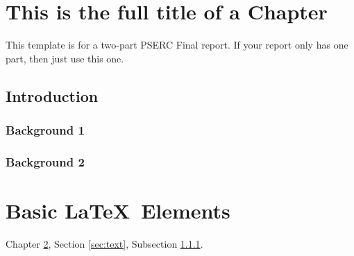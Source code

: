 \documentclass[letterpaper, 12pt, oneside]{book}
\theoremstyle{plain}
\theoremstyle{definition}
\theoremstyle{remark}
\begin{document}
\newpage
\quad \vspace{-1in} %
\listoffigures

\newpage
\quad \vspace{-1in} %
\listoftables




\chapter[Short Chapter Title]{This is the full title of a Chapter}
\label{chap:chapter1}
This template is for a two-part PSERC Final report. If your report only has one part, then just use this one.
\section{Introduction} %
\label{sec:introduction}

\subsection{Background 1} %
\label{sub:background_1}


\subsection{Background 2} %
\label{sub:background_2}



\chapter[Table, Figures, and Equations]{Basic \LaTeX~Elements}
\label{chap:chapter2}
Chapter \ref{chap:chapter2}, Section \ref{sec:text}, Subsection \ref{sub:background_1}.
\end{document}
